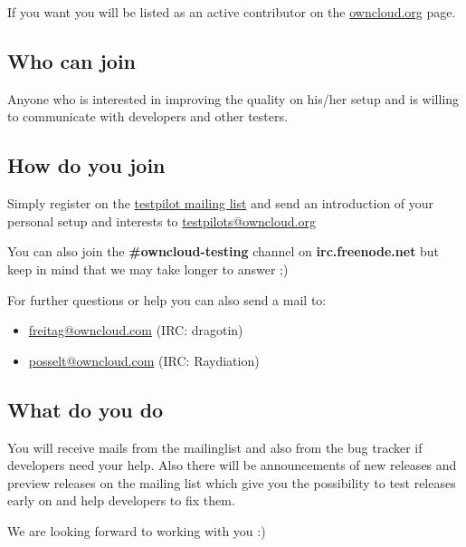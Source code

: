 \documentclass[letterpaper,10pt,english]{sphinxmanual}
\begin{document}
If you want you will be listed as an active contributor on the \href{https://owncloud.org}{owncloud.org} page.


\subsection{Who can join}
\label{testing/index:who-can-join}
Anyone who is interested in improving the quality on his/her setup and is willing to communicate with developers and other testers.


\subsection{How do you join}
\label{testing/index:how-do-you-join}
Simply register on the \href{https://mailman.owncloud.org/mailman/listinfo/testpilots}{testpilot mailing list} and send an introduction of your personal setup and interests to \href{mailto:testpilots@owncloud.org}{testpilots@owncloud.org}

You can also join the \textbf{\#owncloud-testing} channel on \textbf{irc.freenode.net} but keep in mind that we may take longer to answer ;)

For further questions or help you can also send a mail to:
\begin{itemize}
\item {} 
\href{mailto:freitag@owncloud.com}{freitag@owncloud.com} (IRC: dragotin)

\item {} 
\href{mailto:posselt@owncloud.com}{posselt@owncloud.com} (IRC: Raydiation)

\end{itemize}


\subsection{What do you do}
\label{testing/index:what-do-you-do}
You will receive mails from the mailinglist and also from the bug tracker if developers need your help. Also there will be announcements of new releases and preview releases on the mailing list which give you the possibility to test releases early on and help developers to fix them.

We are looking forward to working with you :)
\end{document}
